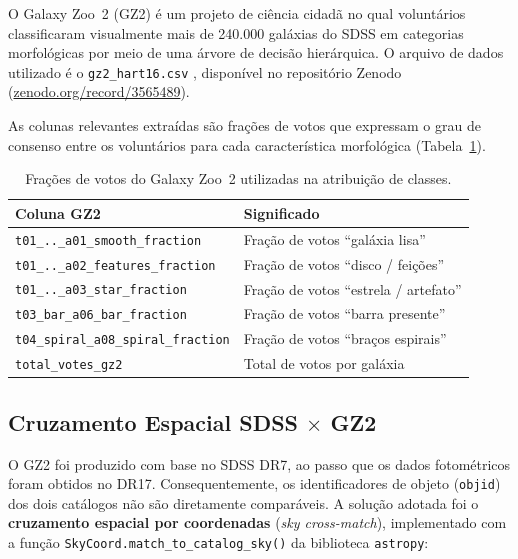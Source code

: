 \documentclass[12pt, a4paper]{article}
\begin{document}
O Galaxy Zoo~2 (GZ2) é um projeto de ciência cidadã no qual voluntários
classificaram visualmente mais de 240.000 galáxias do SDSS em categorias
morfológicas por meio de uma árvore de decisão hierárquica. O arquivo de
dados utilizado é o \texttt{gz2\_hart16.csv} \cite{hart2016}, disponível no
repositório Zenodo (\href{https://zenodo.org/record/3565489}{zenodo.org/record/3565489}).

As colunas relevantes extraídas são frações de votos que expressam o grau de
consenso entre os voluntários para cada característica morfológica
(Tabela~\ref{tab:gz2_cols}).

\begin{table}[H]
  \centering
  \caption{Frações de votos do Galaxy Zoo~2 utilizadas na atribuição de classes.}
  \label{tab:gz2_cols}
  \begin{tabular}{lp{9cm}}
    \toprule
    \textbf{Coluna GZ2} & \textbf{Significado} \\
    \midrule
    \texttt{t01\_..\_a01\_smooth\_fraction}   & Fração de votos ``galáxia lisa'' \\
    \texttt{t01\_..\_a02\_features\_fraction} & Fração de votos ``disco / feições'' \\
    \texttt{t01\_..\_a03\_star\_fraction}     & Fração de votos ``estrela / artefato'' \\
    \texttt{t03\_bar\_a06\_bar\_fraction}     & Fração de votos ``barra presente'' \\
    \texttt{t04\_spiral\_a08\_spiral\_fraction} & Fração de votos ``braços espirais'' \\
    \texttt{total\_votes\_gz2}               & Total de votos por galáxia \\
    \bottomrule
  \end{tabular}
\end{table}

\subsection{Cruzamento Espacial SDSS $\times$ GZ2}

O GZ2 foi produzido com base no SDSS DR7, ao passo que os dados fotométricos
foram obtidos no DR17. Consequentemente, os identificadores de objeto
(\texttt{objid}) dos dois catálogos não são diretamente comparáveis. A solução
adotada foi o \textbf{cruzamento espacial por coordenadas} (\textit{sky cross-match}),
implementado com a função \texttt{SkyCoord.match\_to\_catalog\_sky()} da biblioteca
\texttt{astropy}:
\end{document}
